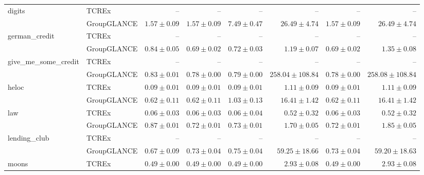 \begin{table}[ht]
\begin{center}
\begin{sc}
\begin{scriptsize}
\begin{tabular}{l|l|rrrrrr}
\midrule
\multirow{2}{*}{digits} & TCREx & -- & -- & -- & -- & -- & -- \\
 & GroupGLANCE & $\boldsymbol{1.57\pm{0.09}}$ & $\boldsymbol{1.57\pm{0.09}}$ & $\boldsymbol{7.49\pm{0.47}}$ & $\boldsymbol{26.49\pm{4.74}}$ & $\boldsymbol{1.57\pm{0.09}}$ & $\boldsymbol{26.49\pm{4.74}}$ \\
\midrule
\multirow{2}{*}{german\_credit} & TCREx & -- & -- & -- & -- & -- & -- \\
 & GroupGLANCE & $\boldsymbol{0.84\pm{0.05}}$ & $\boldsymbol{0.69\pm{0.02}}$ & $\boldsymbol{0.72\pm{0.03}}$ & $\boldsymbol{1.19\pm{0.07}}$ & $\boldsymbol{0.69\pm{0.02}}$ & $\boldsymbol{1.35\pm{0.08}}$ \\
\midrule
\multirow{2}{*}{give\_me\_some\_credit} & TCREx & -- & -- & -- & -- & -- & -- \\
 & GroupGLANCE & $\boldsymbol{0.83\pm{0.01}}$ & $\boldsymbol{0.78\pm{0.00}}$ & $\boldsymbol{0.79\pm{0.00}}$ & $\boldsymbol{258.04\pm{108.84}}$ & $\boldsymbol{0.78\pm{0.00}}$ & $\boldsymbol{258.08\pm{108.84}}$ \\
\midrule
\multirow{2}{*}{heloc} & TCREx & $\boldsymbol{0.09\pm{0.01}}$ & $\boldsymbol{0.09\pm{0.01}}$ & $\boldsymbol{0.09\pm{0.01}}$ & $\boldsymbol{1.11\pm{0.09}}$ & $\boldsymbol{0.09\pm{0.01}}$ & $\boldsymbol{1.11\pm{0.09}}$ \\
 & GroupGLANCE & $0.62\pm{0.11}$ & $0.62\pm{0.11}$ & $1.03\pm{0.13}$ & $16.41\pm{1.42}$ & $0.62\pm{0.11}$ & $16.41\pm{1.42}$ \\
\midrule
\multirow{2}{*}{law} & TCREx & $\boldsymbol{0.06\pm{0.03}}$ & $\boldsymbol{0.06\pm{0.03}}$ & $\boldsymbol{0.06\pm{0.04}}$ & $\boldsymbol{0.52\pm{0.32}}$ & $\boldsymbol{0.06\pm{0.03}}$ & $\boldsymbol{0.52\pm{0.32}}$ \\
 & GroupGLANCE & $0.87\pm{0.01}$ & $0.72\pm{0.01}$ & $0.73\pm{0.01}$ & $1.70\pm{0.05}$ & $0.72\pm{0.01}$ & $1.85\pm{0.05}$ \\
\midrule
\multirow{2}{*}{lending\_club} & TCREx & -- & -- & -- & -- & -- & -- \\
 & GroupGLANCE & $\boldsymbol{0.67\pm{0.09}}$ & $\boldsymbol{0.73\pm{0.04}}$ & $\boldsymbol{0.75\pm{0.04}}$ & $\boldsymbol{59.25\pm{18.66}}$ & $\boldsymbol{0.73\pm{0.04}}$ & $\boldsymbol{59.20\pm{18.63}}$ \\
\midrule
\multirow{2}{*}{moons} & TCREx & $\boldsymbol{0.49\pm{0.00}}$ & $\boldsymbol{0.49\pm{0.00}}$ & $\boldsymbol{0.49\pm{0.00}}$ & $\boldsymbol{2.93\pm{0.08}}$ & $\boldsymbol{0.49\pm{0.00}}$ & $\boldsymbol{2.93\pm{0.08}}$ \\

\end{tabular}
\end{scriptsize}
\end{sc}
\end{center}
\end{table}
